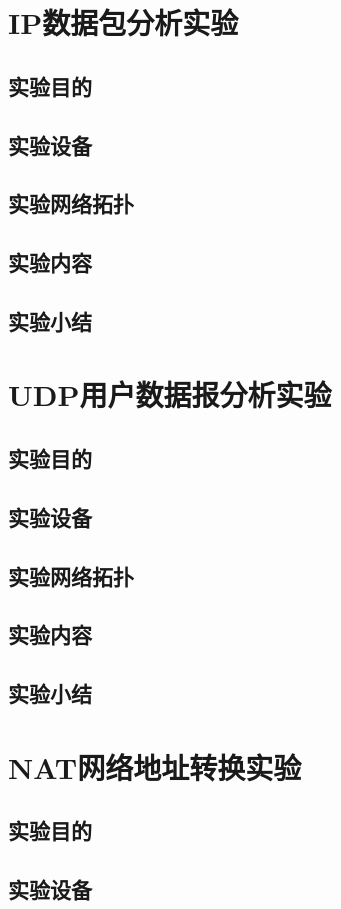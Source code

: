 \documentclass[lang=cn,11pt,a4paper,cite=authoryear]{elegantpaper}
\begin{document}
\section{IP数据包分析实验}
\subsection{实验目的}
\subsection{实验设备}
\subsection{实验网络拓扑}
\subsection{实验内容}
\subsection{实验小结}
\section{UDP用户数据报分析实验}
\subsection{实验目的}
\subsection{实验设备}
\subsection{实验网络拓扑}
\subsection{实验内容}
\subsection{实验小结}
\section{NAT网络地址转换实验}
\subsection{实验目的}
\subsection{实验设备}
\end{document}
